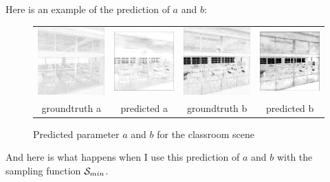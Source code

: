 \documentclass{classeENS}
\begin{document}
Here is an example of the prediction of $a$ and $b$:
\begin{figure}[H]
    \centering
    \caption{Predicted parameter $a$ and $b$ for the classroom scene}
    \begin{tabular}{cccc}
    \includegraphics[width=35mm]{image/without/a.png}
    & \includegraphics[width=35mm]{image/without/pa.png}
    & \includegraphics[width=35mm]{image/without/b.png}
    & \includegraphics[width=35mm]{image/without/pb.png} \\
    groundtruth a & predicted a
    &groundtruth b & predicted b \\
    \end{tabular}
\end{figure}
And here is what happens when I use this prediction of $a$ and $b$ with the sampling function $\mathcal S_{min}$.
\end{document}
